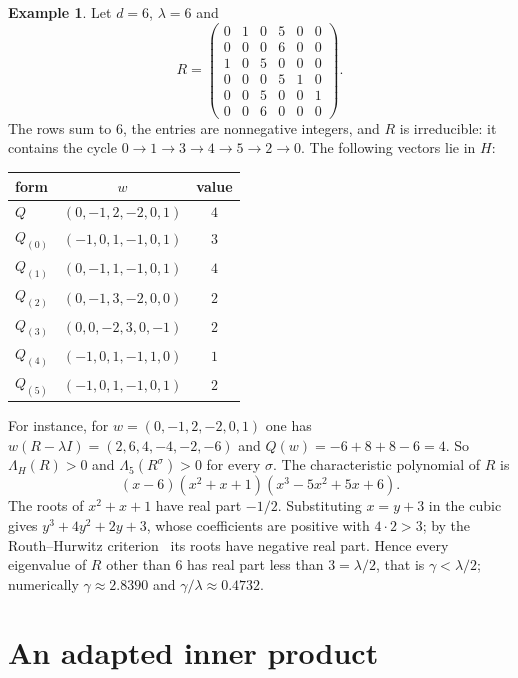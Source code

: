 \documentclass[11pt]{amsart}
\theoremstyle{definition}
\newtheorem{example}[theorem]{Example}
\theoremstyle{remark}
\begin{document}
\begin{example}\label{ex:small}
Let $d=6$, $\lambda=6$ and
\[
R=\begin{pmatrix}
0&1&0&5&0&0\\
0&0&0&6&0&0\\
1&0&5&0&0&0\\
0&0&0&5&1&0\\
0&0&5&0&0&1\\
0&0&6&0&0&0
\end{pmatrix}.
\]
The rows sum to $6$, the entries are nonnegative integers, and $R$ is irreducible: it contains the cycle $0\to1\to3\to4\to5\to2\to0$. The following vectors lie in $H$:
\begin{center}
\renewcommand{\arraystretch}{1.15}
\begin{tabular}{lcc}
form & $w$ & value\\ \hline
$Q$ & $(0,-1,2,-2,0,1)$ & $4$\\
$Q_{(0)}$ & $(-1,0,1,-1,0,1)$ & $3$\\
$Q_{(1)}$ & $(0,-1,1,-1,0,1)$ & $4$\\
$Q_{(2)}$ & $(0,-1,3,-2,0,0)$ & $2$\\
$Q_{(3)}$ & $(0,0,-2,3,0,-1)$ & $2$\\
$Q_{(4)}$ & $(-1,0,1,-1,1,0)$ & $1$\\
$Q_{(5)}$ & $(-1,0,1,-1,0,1)$ & $2$
\end{tabular}
\end{center}
For instance, for $w=(0,-1,2,-2,0,1)$ one has $w(R-\lambda I)=(2,6,4,-4,-2,-6)$ and $Q(w)=-6+8+8-6=4$. So $\Lambda_H(R)>0$ and $\Lambda_5(R^\sigma)>0$ for every $\sigma$. The characteristic polynomial of $R$ is
\[
(x-6)(x^2+x+1)(x^3-5x^2+5x+6).
\]
The roots of $x^2+x+1$ have real part $-1/2$. Substituting $x=y+3$ in the cubic gives $y^3+4y^2+2y+3$, whose coefficients are positive with $4\cdot2>3$; by the Routh--Hurwitz criterion~\cite[Ch.~XV]{Gantmacher} its roots have negative real part. Hence every eigenvalue of $R$ other than $6$ has real part less than $3=\lambda/2$, that is $\gamma<\lambda/2$; numerically $\gamma\approx2.8390$ and $\gamma/\lambda\approx0.4732$.
\end{example}

\section{An adapted inner product}\label{sec:adapted}
\end{document}
